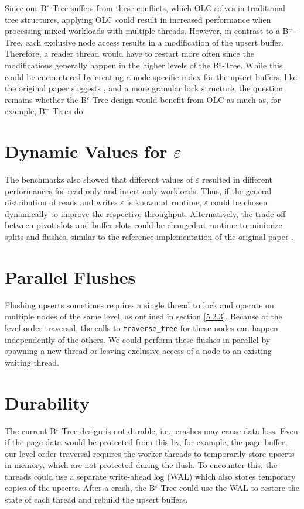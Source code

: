 Since our B$^\varepsilon$-Tree suffers from these conflicts, which OLC solves in traditional tree structures, applying OLC could result in increased performance when processing mixed workloads with multiple threads. However, in contrast to a B$^+$-Tree, each exclusive node access results in a modification of the upsert buffer. Therefore, a reader thread would have to restart more often since the modifications generally happen in the higher levels of the B$^\varepsilon$-Tree. While this could be encountered by creating a node-specific index for the upsert buffers, like the original paper suggests \cite{b_epsilon_tree}, and a more granular lock structure, the question remains whether the B$^\varepsilon$-Tree design would benefit from OLC as much as, for example, B$^+$-Trees do. 

\section{Dynamic Values for $\varepsilon$}

The benchmarks also showed that different values of $\varepsilon$ resulted in different performances for read-only and insert-only workloads. Thus, if the general distribution of reads and writes  $\varepsilon$ is known at runtime, $\varepsilon$ could be chosen dynamically to improve the respective throughput. Alternatively, the trade-off between pivot slots and buffer slots could be changed at runtime to minimize splits and flushes, similar to the reference implementation of the original paper \cite{reference_b_epsilon_tree}.

\section{Parallel Flushes}

Flushing upserts sometimes requires a single thread to lock and operate on multiple nodes of the same level, as outlined in section \ref{5.2.3}. Because of the level order traversal, the calls to \texttt{traverse\_tree} for these nodes can happen independently of the others. We could perform these flushes in parallel by spawning a new thread or leaving exclusive access of a node to an existing waiting thread. 

\section{Durability}

The current B$^\varepsilon$-Tree design is not durable, i.e., crashes may cause data loss. Even if the page data would be protected from this by, for example, the page buffer, our level-order traversal requires the worker threads to temporarily store upserts in memory, which are not protected during the flush. To encounter this, the threads could use a separate write-ahead log (WAL) which also stores temporary copies of the upserts. After a crash, the B$^\varepsilon$-Tree could use the WAL to restore the state of each thread and rebuild the upsert buffers. 

